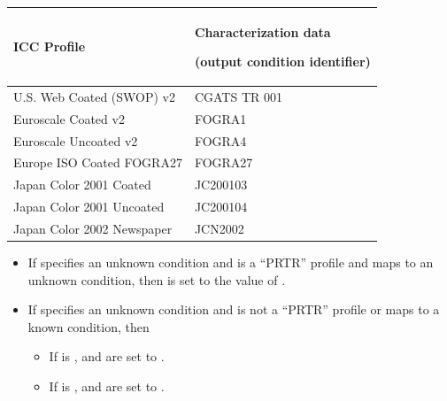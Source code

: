 \documentclass[letterpaper,12pt,english,openany,oneside]{sphinxmanual}
\begin{document}
\begin{savenotes}\sphinxattablestart
\centering
{}\label{\detokenize{PDF_Create_UsingSettings:section-8}}\nobreak
\begin{tabulary}{\linewidth}[t]{|T|T|}
\hline
\sphinxstyletheadfamily 
ICC Profile
&\sphinxstyletheadfamily 
Characterization data

(output condition identifier)
\\
\hline
U.S. Web Coated (SWOP) v2
&
CGATS TR 001
\\
\hline
Euroscale Coated v2
&
FOGRA1
\\
\hline
Euroscale Uncoated v2
&
FOGRA4
\\
\hline
Europe ISO Coated FOGRA27
&
FOGRA27
\\
\hline
Japan Color 2001 Coated
&
JC200103
\\
\hline
Japan Color 2001 Uncoated
&
JC200104
\\
\hline
Japan Color 2002 Newspaper
&
JCN2002
\\
\hline
\end{tabulary}
\par
\sphinxattableend\end{savenotes}
\begin{itemize}
\item {} 
If  specifies an unknown condition and  is a “PRTR” profile and maps to an unknown condition, then  is set to the value of  .

\item {} 
If  specifies an unknown condition and  is not a “PRTR” profile or maps to a known condition, then
\begin{itemize}
\item {} 
If  is  ,  and  are set to  .

\item {} 
If  is  ,  and  are set to  .

\end{itemize}

\end{itemize}
\end{document}
